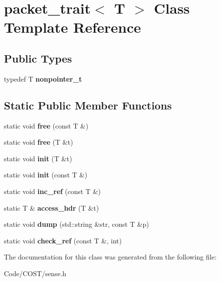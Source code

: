 \hypertarget{classpacket__trait}{}\section{packet\+\_\+trait$<$ T $>$ Class Template Reference}
\label{classpacket__trait}
\subsection*{Public Types}
\begin{DoxyCompactItemize}
\item 
\mbox{\label{classpacket__trait_aa990f5abf1502192624a0ac6dee8fe39}} 
typedef T {\bfseries nonpointer\+\_\+t}
\end{DoxyCompactItemize}
\subsection*{Static Public Member Functions}
\begin{DoxyCompactItemize}
\item 
\mbox{\label{classpacket__trait_aead58a3f06691877c9cc238b6622c3e0}} 
static void {\bfseries free} (const T \&)
\item 
\mbox{\label{classpacket__trait_aae7301cf0138f464663e1f1f0157154d}} 
static void {\bfseries free} (T \&t)
\item 
\mbox{\label{classpacket__trait_a0d4a0a9303ca1a5c4f72c93b533c69b0}} 
static void {\bfseries init} (T \&t)
\item 
\mbox{\label{classpacket__trait_a7901dada2a9e7b2816d14b5e72a2bbd0}} 
static void {\bfseries init} (const T \&)
\item 
\mbox{\label{classpacket__trait_ae28b501af918c3ca292d919ce09e273f}} 
static void {\bfseries inc\+\_\+ref} (const T \&)
\item 
\mbox{\label{classpacket__trait_af031a338404f854cf14a4f56cabdf3a0}} 
static T \& {\bfseries access\+\_\+hdr} (T \&t)
\item 
\mbox{\label{classpacket__trait_affc6b8949fe2de2ec1479f35aa0e2179}} 
static void {\bfseries dump} (std\+::string \&str, const T \&p)
\item 
\mbox{\label{classpacket__trait_a69dd8c8982cdca1f85b077d1cfbb5fba}} 
static void {\bfseries check\+\_\+ref} (const T \&, int)
\end{DoxyCompactItemize}


The documentation for this class was generated from the following file\+:\begin{DoxyCompactItemize}
\item 
Code/\+C\+O\+S\+T/sense.\+h\end{DoxyCompactItemize}
